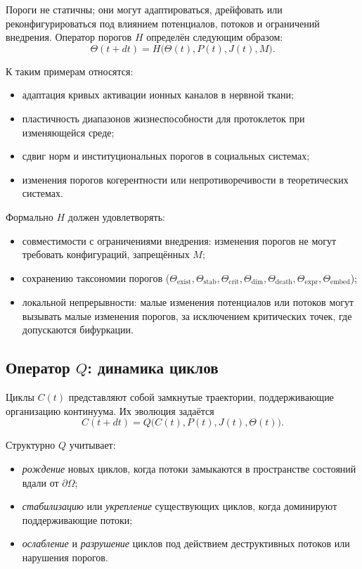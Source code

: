 Пороги не статичны; они могут адаптироваться, дрейфовать или
реконфигурироваться под влиянием потенциалов, потоков и ограничений
внедрения. Оператор порогов \(H\) определён следующим образом:
\[
  \Theta(t+dt) = H\big(\Theta(t), P(t), J(t), M\big).
\]

К таким примерам относятся:
\begin{itemize}
  \item адаптация кривых активации ионных каналов в нервной ткани;
  \item пластичность диапазонов жизнеспособности для протоклеток при изменяющейся
        среде;
  \item сдвиг норм и институциональных порогов в социальных системах;
  \item изменения порогов когерентности или непротиворечивости в
        теоретических системах.
\end{itemize}

Формально \(H\) должен удовлетворять:
\begin{itemize}
  \item совместимости с ограничениями внедрения: изменения порогов не могут
        требовать конфигураций, запрещённых \(M\);
  \item сохранению таксономии порогов
        (\(\Theta_{\mathrm{exist}}, \Theta_{\mathrm{stab}},
        \Theta_{\mathrm{crit}}, \Theta_{\mathrm{dim}},
        \Theta_{\mathrm{death}}, \Theta_{\mathrm{expr}}, \Theta_{\mathrm{embed}}\));
  \item локальной непрерывности: малые изменения потенциалов или потоков могут
        вызывать малые изменения порогов, за исключением критических точек,
        где допускаются бифуркации.
\end{itemize}

\subsection{Оператор \texorpdfstring{\texorpdfstring{$Q$}{Q}}{Q}: динамика циклов}

Циклы \(C(t)\) представляют собой замкнутые траектории, поддерживающие
организацию континуума. Их эволюция задаётся
\[
  C(t+dt) = Q\big(C(t), P(t), J(t), \Theta(t)\big).
\]

Структурно \(Q\) учитывает:
\begin{itemize}
  \item \emph{рождение} новых циклов, когда потоки замыкаются в пространстве
        состояний вдали от \(\partial\Omega\);
  \item \emph{стабилизацию} или \emph{укрепление} существующих циклов, когда
        доминируют поддерживающие потоки;
  \item \emph{ослабление} и \emph{разрушение} циклов под действием
        деструктивных потоков или нарушения порогов.
\end{itemize}

